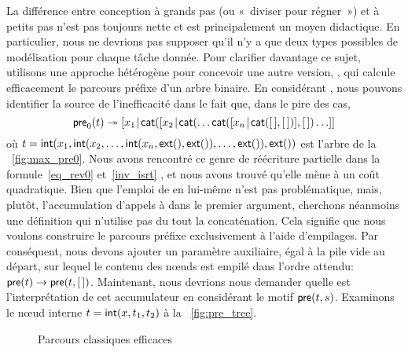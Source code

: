 La différence entre conception à grands pas (ou «~diviser pour régner~») et à
petits pas n'est pas toujours nette et
est principalement un moyen didactique. En particulier, nous ne
devrions pas supposer qu'il n'y a que deux types possibles de
modélisation pour chaque tâche donnée. Pour clarifier davantage ce
sujet, utilisons une approche hétérogène pour concevoir une autre
version, , qui calcule efficacement
le parcours préfixe d'un arbre binaire. En considérant
, nous pouvons
identifier la source de l'inefficacité dans le fait que, dans le pire
des cas,
\begin{equation*}
\fun{pre}_0(t) \twoheadrightarrow
\cons{x_1}{\fun{cat}(\cons{x_2}{\fun{cat}(\dots
    \fun{cat}(\cons{x_n}{\fun{cat}(\el, \el)},\el) \dots}}
\index{cat@\fun{cat/2}}
\end{equation*}
où \(t = \textsf{int}(x_1,\textsf{int}(x_2,\dots, \textsf{int}(x_n,
\textsf{ext}(), \textsf{ext}()), \dots, \textsf{ext}()),\textsf{ext}())\) est
l'arbre de la \fig~\vref{fig:max_pre0}. Nous avons rencontré ce genre
de réécriture partielle dans la
formule~\eqref{eq_rev0}
 et~\eqref{inv_isrt}
,
et nous avons trouvé qu'elle mène à un coût quadratique. Bien que
l'emploi de  en lui-même n'est pas
problématique, mais, plutôt, l'accumulation d'appels à
 dans le premier argument, cherchons
néanmoins une définition qui n'utilise pas du tout la concaténation.
Cela signifie que nous voulons construire le parcours préfixe
exclusivement à l'aide d'empilages. Par conséquent, nous devons
ajouter un paramètre auxiliaire, égal à la pile vide au départ, sur
lequel le contenu des n{\oe}uds est empilé dans l'ordre attendu:
\(\textsf{pre}(t) \rightarrow \textsf{pre}(t,[\,])\).
Maintenant, nous devrions nous demander quelle est l'interprétation de
cet accumulateur en
considérant le motif \(\textsf{pre}(t,s)\). Examinons le n{\oe}ud interne
\(t=\textsf{int}(x,t_1,t_2)\) à la \fig~\vref{fig:pre_tree}.
\begin{figure}
\centering
{}
\caption{Parcours classiques efficaces\label{fig:classic_walks}}
\end{figure}
